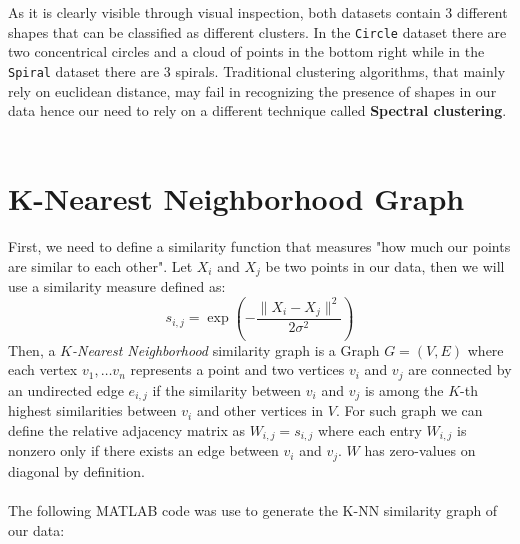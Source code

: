 \documentclass{article}
\numberwithin{equation}{section}
\theoremstyle{definition}
\theoremstyle{plain}
\theoremstyle{definition}
\theoremstyle{remark}
\begin{document}
As it is clearly visible through visual inspection, both datasets contain \(3\) different shapes that can be classified as different clusters. In the \texttt{Circle} dataset there are two concentrical circles and a cloud of points in the bottom right while in the \texttt{Spiral} dataset there are 3 spirals. Traditional clustering algorithms, that mainly rely on euclidean distance, may fail in recognizing the presence of shapes in our data hence our need to rely on a different technique called \textbf{Spectral clustering}. 
\\
\\

\section{K-Nearest Neighborhood Graph}
First, we need to define a similarity function that measures "how much our points are similar to each other". Let \(X_i\) and \(X_j\) be two points in our data, then we will use a similarity measure defined as:
\begin{equation}
  s_{i,j} = \exp \left(- \frac{\| X_i- X_j \|^2}{2\sigma^2}\right)
\end{equation}
Then, a \textit{\(K\)-Nearest Neighborhood} similarity graph is a Graph \(G= (V,E)\) where each vertex \(v_1, \dots v_n\) represents a point and two vertices \(v_i\) and \(v_j\) are connected by an undirected edge \(e_{i,j}\) if the similarity between \(v_i\) and \(v_j\) is among the \(K\)-th highest similarities between \(v_i\) and other vertices in \(V\). For such graph we can define the relative adjacency matrix as \(W_{i,j} = s_{i,j}\) where each entry \(W_{i,j}\) is nonzero only if there exists an edge between \(v_i\) and \(v_j\). \(W\) has zero-values on diagonal by definition.
\\
\\
The following MATLAB code was use to generate the K-NN similarity graph of our data:


\end{document}
